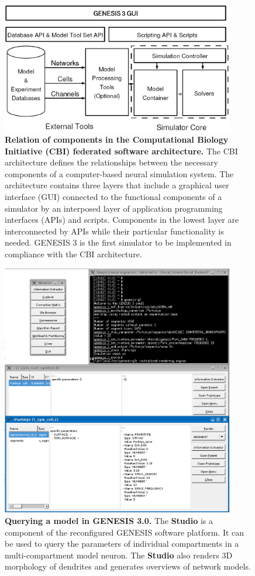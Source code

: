 \documentclass[10pt]{article}
\begin{document}
\clearpage

\begin{figure}[ht]
\begin{center}
\includegraphics[width=4in]{figures/G3arch.eps}
\end{center}
\caption{
{\bf Relation of components in the Computational Biology Initiative (CBI) federated software architecture.} The CBI architecture defines the relationships between the necessary components of a computer-based neural simulation system. The architecture contains three layers that include a graphical user interface (GUI) connected to the functional components of a simulator by an interposed layer of application programming interfaces (APIs) and scripts. Components in the lowest layer are interconnected by APIs while their particular functionality is needed. GENESIS 3 is the first simulator to be implemented in compliance with the CBI architecture.
}
\label{fig:cbi-arch}
\end{figure}

\clearpage

\begin{figure}[ht]
\begin{center}
\includegraphics[width=4in]{figures/studio-screenshot.eps}
\end{center}
\caption{
{\bf Querying a model in GENESIS 3.0.} The {\bf Studio} is a component of the reconfigured GENESIS software platform. It can be used to query the parameters of individual compartments in a multi-compartment model neuron. The {\bf Studio} also renders 3D morphology of dendrites and generates overviews of network models.
}
\label{fig:cbi-studio}
\end{figure}
\end{document}
